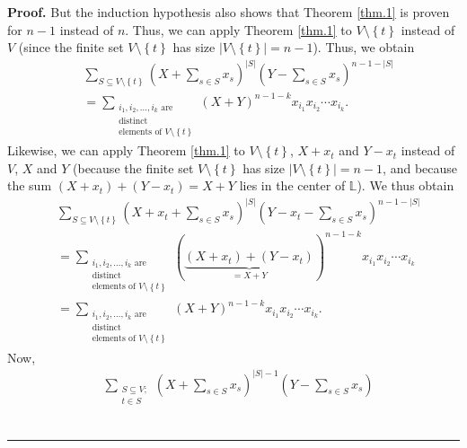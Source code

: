 \documentclass[numbers=enddot,12pt,final,onecolumn,notitlepage]{scrartcl}%
\theoremstyle{definition}
\newenvironment{proof}[1][Proof]{\noindent\textbf{#1.} }{\ \rule{0.5em}{0.5em}}
\let\sumnonlimits\sum
\renewcommand{\sum}{\sumnonlimits\limits}
\newenvironment{vershort}{}{}
\begin{document}
\begin{vershort}
\begin{proof}
But the induction hypothesis also shows that Theorem \ref{thm.1} is proven for
$n-1$ instead of $n$. Thus, we can apply Theorem \ref{thm.1} to $V\setminus
\left\{  t\right\}  $ instead of $V$ (since the finite set $V\setminus\left\{
t\right\}  $ has size $\left\vert V\setminus\left\{  t\right\}  \right\vert
=n-1$). Thus, we obtain%
\begin{align}
&  \sum_{S\subseteq V\setminus\left\{  t\right\}  }\left(  X+\sum_{s\in
S}x_{s}\right)  ^{\left\vert S\right\vert }\left(  Y-\sum_{s\in S}%
x_{s}\right)  ^{n-1-\left\vert S\right\vert }\nonumber\\
&  =\sum_{\substack{i_{1},i_{2},\ldots,i_{k}\text{ are}\\\text{distinct}%
\\\text{elements of }V\setminus\left\{  t\right\}  }}\left(  X+Y\right)
^{n-1-k}x_{i_{1}}x_{i_{2}}\cdots x_{i_{k}}. \label{pf.thm.2.4}%
\end{align}
Likewise, we can apply Theorem \ref{thm.1} to $V\setminus\left\{  t\right\}
$, $X+x_{t}$ and $Y-x_{t}$ instead of $V$, $X$ and $Y$ (because the finite set
$V\setminus\left\{  t\right\}  $ has size $\left\vert V\setminus\left\{
t\right\}  \right\vert =n-1$, and because the sum $\left(  X+x_{t}\right)
+\left(  Y-x_{t}\right)  =X+Y$ lies in the center of $\mathbb{L}$). We thus
obtain
\begin{align}
&  \sum_{S\subseteq V\setminus\left\{  t\right\}  }\left(  X+x_{t}+\sum_{s\in
S}x_{s}\right)  ^{\left\vert S\right\vert }\left(  Y-x_{t}-\sum_{s\in S}%
x_{s}\right)  ^{n-1-\left\vert S\right\vert }\nonumber\\
&  =\sum_{\substack{i_{1},i_{2},\ldots,i_{k}\text{ are}\\\text{distinct}%
\\\text{elements of }V\setminus\left\{  t\right\}  }}\left(
\underbrace{\left(  X+x_{t}\right)  +\left(  Y-x_{t}\right)  }_{=X+Y}\right)
^{n-1-k}x_{i_{1}}x_{i_{2}}\cdots x_{i_{k}}\nonumber\\
&  =\sum_{\substack{i_{1},i_{2},\ldots,i_{k}\text{ are}\\\text{distinct}%
\\\text{elements of }V\setminus\left\{  t\right\}  }}\left(  X+Y\right)
^{n-1-k}x_{i_{1}}x_{i_{2}}\cdots x_{i_{k}}. \label{pf.thm.2.5}%
\end{align}
Now,%
\begin{align}
&  \sum_{\substack{S\subseteq V;\\t\in S}}\left(  X+\sum_{s\in S}x_{s}\right)
^{\left\vert S\right\vert -1}\left(  Y-\sum_{s\in S}x_{s}\right)

\end{align}
\end{proof}
\end{vershort}
\end{document}
